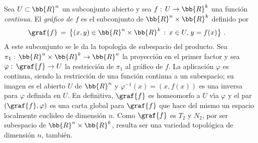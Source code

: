 



\begin{ejemplo}%
Sea $U\subset\bb{R}^{n}$ un subconjunto abierto y sea
$f:\,U\rightarrow\bb{R}^{k}$ una funci\'{o}n \emph{continua}. El
\emph{gr\'{a}fico de $f$} es el subconjunto de $\bb{R}^{n}\times\bb{R}^{k}$
definido por
\begin{align*}
	\graf{f} & \,=\,\big\lbrace (x,y)\in\bb{R}^{n}\times\bb{R}^{k}
				\,:\,x\in U,\,y=f(x)\big\rbrace
	\text{ .}
\end{align*}
%
A este subconjunto se le da la topolog\'{\i}a de subespacio del producto.
Sea $\pi_{1}:\,\bb{R}^{n}\times\bb{R}^{k}\rightarrow\bb{R}^{n}$ la
proyecci\'{o}n en el primer factor y sea
$\varphi:\,\graf{f}\rightarrow U$ la restricci\'{o}n de $\pi_{1}$ al
gr\'{a}fico de $f$. La aplicaci\'{o}n $\varphi$ es continua, siendo
la restricci\'{o}n de una funci\'{o}n continua a un subespacio; su imagen
es el abierto $U$ de $\bb{R}^{n}$ y $\varphi^{-1}(x)=(x,f(x))$ es una inversa
para $\varphi$ definida en $U$. En definitiva, $\graf{f}$ es homeomorfo
a $U$ v\'{\i}a $\varphi$ y el par $(\graf{f},\varphi)$ es una carta global
para $\graf{f}$ que hace del mismo un espacio localmente euclideo de
dimensi\'{o}n $n$. Como $\graf{f}$ es $T_{2}$ y $N_{2}$, por ser
subespacio de $\bb{R}^{n}\times\bb{R}^{k}$, resulta ser una variedad
topol\'{o}gica de dimensi\'{o}n $n$, tambi\'{e}n.
\end{ejemplo}

